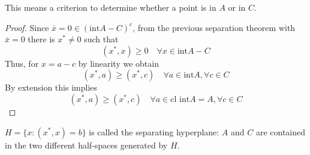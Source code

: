 This means a criterion to determine whether a point is in $A$ or in $C$.
\begin{proof}
    Since $\bar{x} = 0 \in (\text{int}A - C)^c$, from the previous separation theorem with $\bar{x} = 0$ there is $x^\ast \neq 0$ such that
    \[(x^\ast, x) \geq 0 \quad \forall x \in \text{int}A - C\]
    Thus, for $x = a - c$ by linearity we obtain
    \[(x^\ast, a) \geq (x^\ast, c) \quad \forall a \in \text{int}A , \forall c \in C\]
    By extension this implies
    \[(x^\ast, a) \geq (x^\ast, c) \quad \forall a \in \text{cl } \text{int}A = A , \forall c \in C\]
\end{proof}
$H = \{x : (x^\ast, x) = b\}$ is called the separating hyperplane: $A$ and $C$ are contained in the two different half-spaces generated by $H$.
